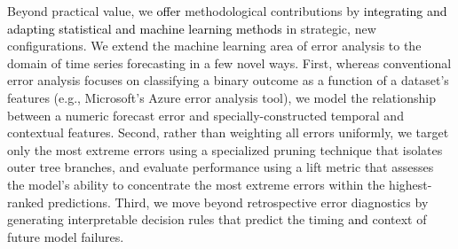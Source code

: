 \documentclass[]{interact}
\newcommand{\galit}[1]{\textcolor{black}{#1}}
\theoremstyle{definition}
\begin{document}
Beyond %
practical value, we \galit{offer} %
methodological contributions by %
\galit{integrating and adapting statistical and machine learning methods}
in strategic, new configurations. We extend the machine learning area of error analysis to the domain of time series forecasting in a few novel ways. First, whereas conventional error analysis focuses on classifying a binary outcome as a function of a %
dataset's features (e.g., Microsoft's Azure error analysis tool),
we model the relationship between a numeric forecast error and specially-constructed
temporal and contextual features. Second, rather than weighting all errors uniformly, we target only the most extreme %
errors using a specialized pruning technique that isolates outer tree branches, and evaluate performance using a lift metric that assesses the model's ability to concentrate the most extreme errors within the highest-ranked predictions. Third, we move beyond retrospective error diagnostics by generating interpretable decision rules that predict the timing \galit{and} context %
of future model failures.
\end{document}
